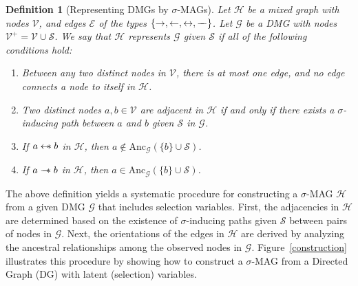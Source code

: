 \documentclass[accepted]{uai2025} %
\newtheorem{definition}{Definition}
\newcommand{\anc}{\text{Anc}}
\newcommand{\tuh}{\mathrel{\rightarrow}}
\newcommand{\hut}{\mathrel{\leftarrow}}
\newcommand{\huh}{\mathrel{\leftrightarrow}}
\newcommand{\hus}{\mathrel{{\leftarrow\mkern-11mu\ast}}}
\newcommand{\tus}{\mathrel{{\relbar\mkern-11mu\relbar\mkern-11mu\ast}}}
\newcommand{\tut}{\mathrel{{\relbar\mkern-9mu\relbar}}}
\begin{document}
\begin{definition}[Representing DMGs by $\sigma$-MAGs] \label{representing}
Let $\mathcal{H}$ be a mixed graph with nodes $ \mathcal{V} $, and edges \(\mathcal{E}\) of the types \(\{\tuh, \hut, \huh, \tut\}\). Let \(\mathcal{G}\) be a DMG with nodes \(\mathcal{V}^+ = \mathcal{V} \cup \mathcal{S}\). We say that \(\mathcal{H}\) represents \(\mathcal{G}\) given \(\mathcal{S}\) if all of the following conditions hold:
\begin{enumerate}
    \item Between any two distinct nodes in $\mathcal{V}$, there is at most one edge, and no edge connects a node to itself in $\mathcal{H}$.
    \item Two distinct nodes \(a,b \in  \mathcal{V}\) are adjacent in \(\mathcal{H}\) if and only if there exists a \(\sigma\)-inducing path between \(a\) and \(b\) given \(\mathcal{S}\) in \(\mathcal{G}\).
    \item If \(a \hus  b\) in \(\mathcal{H}\), then \(a \notin \anc_\mathcal{G}(\{b\} \cup \mathcal{S})\).
    \item If \(a \tus  b\) in \(\mathcal{H}\), then \(a \in \anc_\mathcal{G}(\{b\} \cup \mathcal{S})\).
\end{enumerate}
\end{definition}

The above definition yields a systematic procedure for constructing a $\sigma$-MAG $\mathcal{H}$ from a given DMG $\mathcal{G}$ that includes selection variables. First, the adjacencies in $\mathcal{H}$ are determined based on the existence of $\sigma$-inducing paths given $\mathcal{S}$ between pairs of nodes in $\mathcal{G}$. Next, the orientations of the edges in $\mathcal{H}$ are derived by analyzing the ancestral relationships among the observed nodes in $\mathcal{G}$. Figure~\ref{construction} illustrates this procedure by showing how to construct a $\sigma$-MAG from a Directed Graph (DG) with latent (selection) variables.
\end{document}

